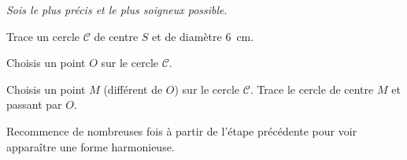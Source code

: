 {\large\textdbend} {\em Sois le plus précis et le plus soigneux
  possible}.
\begin{myenumerate}
  \item Trace un cercle $\mathscr C$ de centre $S$ et de diamètre 6~cm.
  \item Choisis un point $O$ sur le cercle $\mathscr C$.
  \item Choisis un point $M$ (différent de $O$) sur le cercle
    $\mathscr C$. Trace le cercle de centre $M$ et passant par $O$.
  \item Recommence de nombreuses fois à partir de l'étape précédente
    pour voir apparaître une forme harmonieuse.
\end{myenumerate}